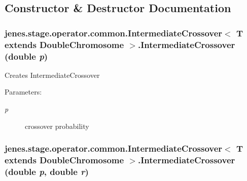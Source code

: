 \subsection{Constructor \& Destructor Documentation}
\hypertarget{classjenes_1_1stage_1_1operator_1_1common_1_1_intermediate_crossover_3_01_t_01extends_01_double_chromosome_01_4_79954756cd6cd0ffc58cd4dfbee77ca3}{
\subsubsection[IntermediateCrossover]{\setlength{\rightskip}{0pt plus 5cm}jenes.stage.operator.common.IntermediateCrossover$<$ T extends {\bf DoubleChromosome} $>$.IntermediateCrossover (double {\em p})}}
\label{classjenes_1_1stage_1_1operator_1_1common_1_1_intermediate_crossover_3_01_t_01extends_01_double_chromosome_01_4_79954756cd6cd0ffc58cd4dfbee77ca3}


Creates IntermediateCrossover

\begin{Desc}
\item[Parameters:]
\begin{description}
\item[{\em p}]crossover probability \end{description}
\end{Desc}
\hypertarget{classjenes_1_1stage_1_1operator_1_1common_1_1_intermediate_crossover_3_01_t_01extends_01_double_chromosome_01_4_1e108f61a2e8e654e65162ef8833441f}{
\subsubsection[IntermediateCrossover]{\setlength{\rightskip}{0pt plus 5cm}jenes.stage.operator.common.IntermediateCrossover$<$ T extends {\bf DoubleChromosome} $>$.IntermediateCrossover (double {\em p}, \/  double {\em r})}}
\label{classjenes_1_1stage_1_1operator_1_1common_1_1_intermediate_crossover_3_01_t_01extends_01_double_chromosome_01_4_1e108f61a2e8e654e65162ef8833441f}


